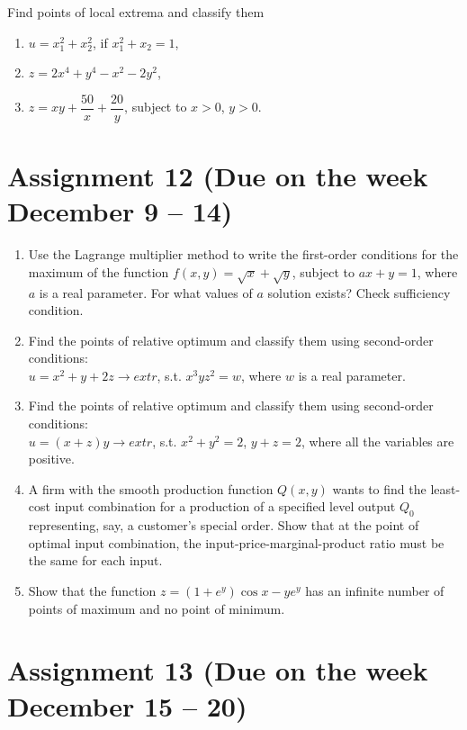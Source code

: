 \documentclass[12pt]{article} %
\theoremstyle{definition} %
\begin{document}
Find points of local extrema and classify them

\begin{enumerate}[resume]
\item $u=x_1^2+x_2^2$, if $x_1^2+x_2=1$,
\item $z=2x^4+y^4-x^2-2y^2$,
\item $z=xy+\dfrac{50}x+\dfrac{20}y$, subject to $x>0$, $y>0$.
\end{enumerate}




\section{Assignment 12 (Due on the week December 9 – 14)}

\begin{enumerate}
\item Use the Lagrange multiplier method to write the first-order conditions 
for the maximum of the function $f(x,y)=\sqrt{x}+\sqrt{y}$, subject to $ax+y=1$, 
where $a$ is a real parameter. For what values of $a$ solution exists? Check sufficiency condition.

\item Find the points of relative optimum and classify them using second-order conditions:\\ 
$u=x^2+y+2z\rightarrow extr$, s.t. $x^3yz^2=w$, where $w$ is a real parameter.

\item Find the points of relative optimum and classify them using second-order conditions:\\ 
$u=(x+z)y\rightarrow extr$, s.t. $x^2+y^2=2$, $y+z=2$, where all the variables are positive.
    
\item A firm with the smooth production function $Q(x,y)$ wants to find the least-cost input combination 
for a production of a specified level output $Q_0$ representing, say, a customer's special order. 
Show that at the point of optimal input combination, 
the input-price-marginal-product ratio must be the same for each input.
\item Show that the function $z=(1+e^y)\cos x-y e^y$ 
has an infinite number of points of maximum and no point of minimum.
\end{enumerate}



\section{Assignment 13 (Due on the week December 15 – 20)}
\end{document}
